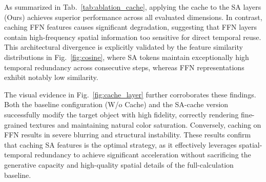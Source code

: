 As summarized in Tab.~\ref{tab:ablation_cache}, applying the cache to the SA layers (Ours) achieves superior performance across all evaluated dimensions. In contrast, caching FFN features causes significant degradation, suggesting that FFN layers contain high-frequency spatial information too sensitive for direct temporal reuse. This architectural divergence is explicitly validated by the feature similarity distributions in Fig.~\ref{fig:cosine}, where SA tokens maintain exceptionally high temporal redundancy across consecutive steps, whereas FFN representations exhibit notably low similarity.

The visual evidence in Fig.~\ref{fig:cache_layer} further corroborates these findings. Both the baseline configuration (W/o Cache) and the SA-cache version successfully modify the target object with high fidelity, correctly rendering fine-grained textures and maintaining natural color saturation. Conversely, caching on FFN results in severe blurring and structural instability. These results confirm that caching SA features is the optimal strategy, as it effectively leverages spatial-temporal redundancy to achieve significant acceleration without sacrificing the generative capacity and high-quality spatial details of the full-calculation baseline.
